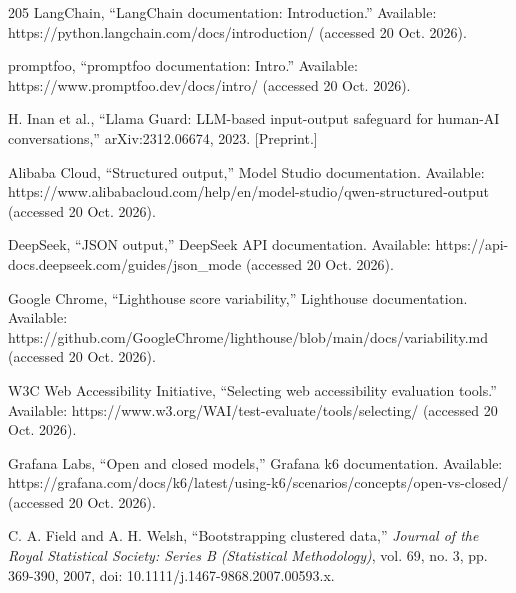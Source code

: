 \begin{thebibliography}{205}
 LangChain, ``LangChain documentation: Introduction.\allowbreak{}'' Available: https:/\allowbreak{}/\allowbreak{}python.\allowbreak{}langchain.\allowbreak{}com/\allowbreak{}docs/\allowbreak{}introduction/ (accessed 20 Oct. 2026).

 promptfoo, ``promptfoo documentation: Intro.'' Available: https:/\allowbreak{}/\allowbreak{}www.\allowbreak{}promptfoo.\allowbreak{}dev/\allowbreak{}docs/\allowbreak{}intro/ (accessed 20 Oct. 2026).

 H. Inan et al., ``Llama Guard: LLM-based input-\allowbreak{}output safeguard for human-AI conversations,'' arXiv:2312.\allowbreak{}06674, 2023. [Preprint.]

 Alibaba Cloud, ``Structured output,'' Model Studio documentation. Available: https:/\allowbreak{}/\allowbreak{}www.\allowbreak{}alibabacloud.\allowbreak{}com/\allowbreak{}help/\allowbreak{}en/\allowbreak{}model-\allowbreak{}studio/\allowbreak{}qwen-\allowbreak{}structured-\allowbreak{}output (accessed 20 Oct. 2026).

 DeepSeek, ``JSON output,'' DeepSeek API documentation. Available: https:/\allowbreak{}/\allowbreak{}api-\allowbreak{}docs.\allowbreak{}deepseek.\allowbreak{}com/\allowbreak{}guides/\allowbreak{}json\_\allowbreak{}mode (accessed 20 Oct. 2026).

 Google Chrome, ``Lighthouse score variability,'' Lighthouse documentation. Available: https:/\allowbreak{}/\allowbreak{}github.\allowbreak{}com/\allowbreak{}GoogleChrome/\allowbreak{}lighthouse/\allowbreak{}blob/\allowbreak{}main/\allowbreak{}docs/\allowbreak{}variability.\allowbreak{}md (accessed 20 Oct. 2026).

 W3C Web Accessibility Initiative, ``Selecting web accessibility evaluation tools.'' Available: https:/\allowbreak{}/\allowbreak{}www.\allowbreak{}w3.\allowbreak{}org/\allowbreak{}WAI/\allowbreak{}test-\allowbreak{}evaluate/\allowbreak{}tools/\allowbreak{}selecting/ (accessed 20 Oct. 2026).

 Grafana Labs, ``Open and closed models,'' Grafana k6 documentation. Available: https:/\allowbreak{}/\allowbreak{}grafana.\allowbreak{}com/\allowbreak{}docs/\allowbreak{}k6/\allowbreak{}latest/\allowbreak{}using-\allowbreak{}k6/\allowbreak{}scenarios/\allowbreak{}concepts/\allowbreak{}open-\allowbreak{}vs-\allowbreak{}closed/ (accessed 20 Oct. 2026).

 C. A. Field and A. H. Welsh, ``Bootstrapping clustered data,'' \textit{Journal of the Royal Statistical Society: Series B (Statistical Methodology)}, vol. 69, no. 3, pp. 369-390, 2007, doi: 10.\allowbreak{}1111/\allowbreak{}j.\allowbreak{}1467-\allowbreak{}9868.\allowbreak{}2007.\allowbreak{}00593.\allowbreak{}x.
\end{thebibliography}
\endgroup
